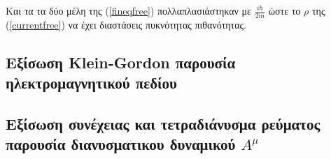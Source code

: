  Kαι τα τα δύο μέλη της (\ref{fineqfree}) πολλαπλασιάστηκαν με $\frac{i \hbar}{2m}$ ώστε το $\rho$ της (\ref{currentfree}) να έχει διαστάσεις πυκνότητας πιθανότητας.
\subsection{Εξίσωση \textlatin{Klein-Gordon} παρουσία ηλεκτρομαγνητικού πεδίου}
\subsection{Εξίσωση συνέχειας και τετραδιάνυσμα ρεύματος παρουσία διανυσματικου δυναμικού $A^\mu$}  
